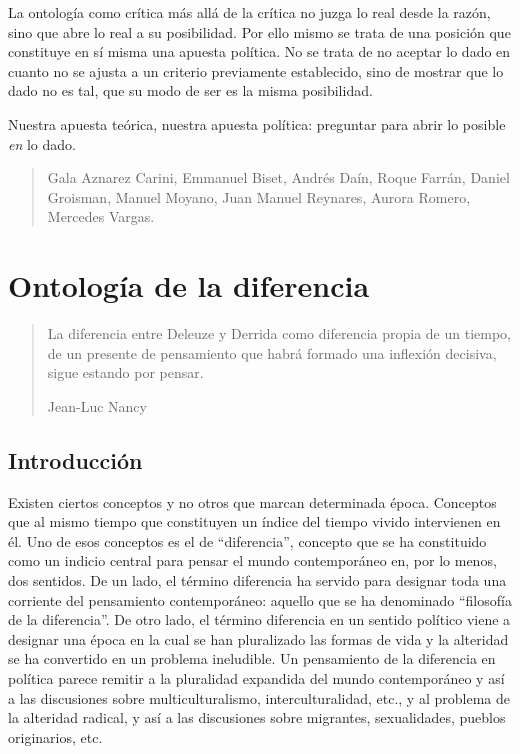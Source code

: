 La ontología como crítica más allá de la crítica no juzga lo real desde
la razón, sino que abre lo real a su posibilidad. Por ello mismo se
trata de una posición que constituye en sí misma una apuesta política.
No se trata de no aceptar lo dado en cuanto no se ajusta a un criterio
previamente establecido, sino de mostrar que lo dado no es tal, que su
modo de ser es la misma posibilidad.

Nuestra apuesta teórica, nuestra apuesta política: preguntar para abrir
lo posible \emph{en} lo dado.

\begin{quote}
Gala Aznarez Carini, Emmanuel Biset, Andrés Daín, Roque Farrán, Daniel
Groisman, Manuel Moyano, Juan Manuel Reynares, Aurora Romero, Mercedes
Vargas.
\end{quote}

\mainmatter
\chapter{Ontología de la diferencia}

\begin{quote}
La diferencia entre Deleuze y Derrida como diferencia propia  de un tiempo, de un
presente de pensamiento que habrá formado una inflexión decisiva, sigue
estando por pensar.

Jean-Luc Nancy
\end{quote}

\section{Introducción}

Existen ciertos conceptos y no otros que marcan determinada época.
Conceptos que al mismo tiempo que constituyen un índice del tiempo
vivido intervienen en él. Uno de esos conceptos es el de \enquote{diferencia},
concepto que se ha constituido como un indicio central para pensar el
mundo contemporáneo en, por lo menos, dos sentidos. De un lado, el
término diferencia ha servido para designar toda una corriente del
pensamiento contemporáneo: aquello que se ha denominado \enquote{filosofía de la
diferencia}. De otro lado, el término diferencia en un sentido político
viene a designar una época en la cual se han pluralizado las formas de
vida y la alteridad se ha convertido en un problema ineludible. Un
pensamiento de la diferencia en política parece remitir a la pluralidad
expandida del mundo contemporáneo y así a las discusiones sobre
multiculturalismo, interculturalidad, etc., y al problema de la
alteridad radical, y así a las discusiones sobre migrantes,
sexualidades, pueblos originarios, etc.

